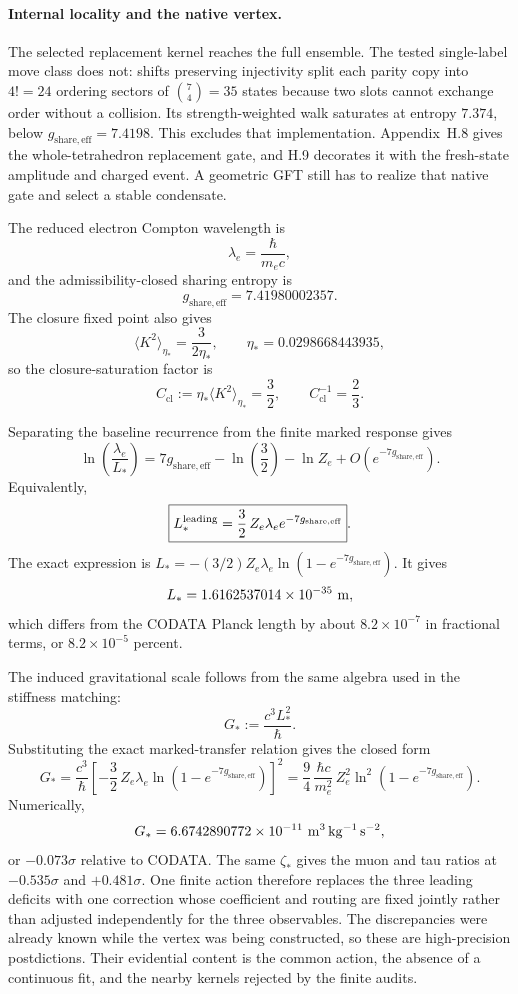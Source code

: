 \documentclass[11pt]{article}
\begin{document}
\paragraph{Internal locality and the native vertex.}
The selected replacement kernel reaches the full ensemble. The tested single-label move class does not: shifts preserving injectivity split each parity copy into $4!=24$ ordering sectors of $\binom{7}{4}=35$ states because two slots cannot exchange order without a collision. Its strength-weighted walk saturates at entropy $7.374$, below $g_{\mathrm{share,eff}}=7.4198$. This excludes that implementation. Appendix~H.8 gives the whole-tetrahedron replacement gate, and H.9 decorates it with the fresh-state amplitude and charged event. A geometric GFT still has to realize that native gate and select a stable condensate.

The reduced electron Compton wavelength is
\[
\lambda_e=\frac{\hbar}{m_ec},
\]
and the admissibility-closed sharing entropy is
\[
g_{\mathrm{share,eff}}=7.41980002357.
\]
The closure fixed point also gives
\[
\langle K^2\rangle_{\eta_*}=\frac{3}{2\eta_*},
\qquad
\eta_*=0.0298668443935,
\]
so the closure-saturation factor is
\[
C_{\mathrm{cl}}:=\eta_*\langle K^2\rangle_{\eta_*}=\frac32,
\qquad
C_{\mathrm{cl}}^{-1}=\frac23.
\]

Separating the baseline recurrence from the finite marked response gives
\[
\ln\!\left(\frac{\lambda_e}{L_*}\right)
=7g_{\mathrm{share,eff}}-\ln\!\left(\frac32\right)-\ln Z_e
+O(e^{-7g_{\mathrm{share,eff}}}).
\]
Equivalently,
\[
\boxed{
L_*^{\rm leading}=\frac32\,Z_e\lambda_e e^{-7g_{\mathrm{share,eff}}}
}.
\]
The exact expression is $L_*=-(3/2)Z_e\lambda_e\ln(1-e^{-7g_{\mathrm{share,eff}}})$. It gives
\[
L_*=1.6162537014\times10^{-35}\ {\rm m},
\]
which differs from the CODATA Planck length by about $8.2\times10^{-7}$ in fractional terms, or $8.2\times10^{-5}$ percent.

The induced gravitational scale follows from the same algebra used in the stiffness matching:
\[
G_*:=\frac{c^3L_*^2}{\hbar}.
\]
Substituting the exact marked-transfer relation gives the closed form
\[
\boxed{
G_*=
\frac{c^3}{\hbar}
\left[-\frac32\,Z_e\lambda_e\ln\!\left(1-e^{-7g_{\mathrm{share,eff}}}\right)\right]^2
=
\frac94\,\frac{\hbar c}{m_e^2}\,
Z_e^2\ln^2\!\left(1-e^{-7g_{\mathrm{share,eff}}}\right)
}.
\]
Numerically,
\[
G_*=6.6742890772\times10^{-11}\ {\rm m^3\,kg^{-1}\,s^{-2}},
\]
or $-0.073\sigma$ relative to CODATA. The same $\zeta_*$ gives the muon and tau ratios at $-0.535\sigma$ and $+0.481\sigma$. One finite action therefore replaces the three leading deficits with one correction whose coefficient and routing are fixed jointly rather than adjusted independently for the three observables. The discrepancies were already known while the vertex was being constructed, so these are high-precision postdictions. Their evidential content is the common action, the absence of a continuous fit, and the nearby kernels rejected by the finite audits.
\end{document}
